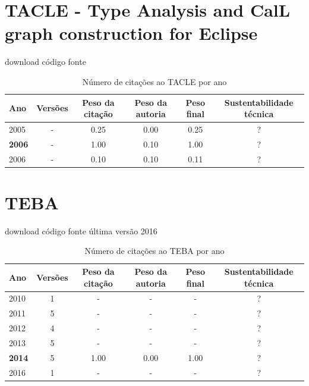 \section{TACLE - Type Analysis and CalL graph construction for Eclipse}
\checkmark download
\checkmark código fonte



\begin{table}[H]
\caption{Número de citações ao TACLE  por ano}
\centering
\begin{tabular}{| l | c | c | c | c | c |}
  \hline
  Ano & Versões & Peso da citação & Peso da autoria & Peso final & Sustentabilidade técnica \\
  \hline
            2005
          &
          -
          &
          0.25
          &
          0.00
          &
            {\color{red} 0.25}
          &
          ?
          \\
\hline
            {\bf 2006}
          &
          -
          &
          1.00
          &
          0.10
          &
            {\color{blue} 1.00}
          &
          ?
          \\
            2006
          &
          -
          &
          0.10
          &
          0.10
          &
            {\color{red} 0.11}
          &
          ?
          \\
\hline
\end{tabular}
\end{table}



\section{TEBA}
\checkmark download
\checkmark código fonte
\checkmark última versão 2016



\begin{table}[H]
\caption{Número de citações ao TEBA por ano}
\centering
\begin{tabular}{| l | c | c | c | c | c |}
  \hline
  Ano & Versões & Peso da citação & Peso da autoria & Peso final & Sustentabilidade técnica \\
  \hline
        2010 & 1 & - & - & - & ? \\
\hline
        2011 & 5 & - & - & - & ? \\
\hline
        2012 & 4 & - & - & - & ? \\
\hline
        2013 & 5 & - & - & - & ? \\
\hline
            {\bf 2014}
          &
          5
          &
          1.00
          &
          0.00
          &
            {\color{blue} 1.00}
          &
          ?
          \\
\hline
        2016 & 1 & - & - & - & ? \\
\hline
\end{tabular}
\end{table}



